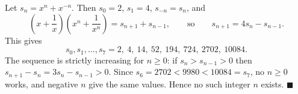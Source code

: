 Let $s_n=x^n+x^{-n}$. Then $s_0=2$, $s_1=4$, $s_{-n}=s_n$, and
\[\left(x+\dfrac1x\right)\left(x^n+\dfrac1{x^n}\right)=s_{n+1}+s_{n-1},\qquad\text{so}\qquad s_{n+1}=4s_n-s_{n-1}.\]
This gives
\[s_0,s_1,\dots,s_7=2,\ 4,\ 14,\ 52,\ 194,\ 724,\ 2702,\ 10084.\]
The sequence is strictly increasing for $n\ge0$: if $s_n>s_{n-1}>0$ then $s_{n+1}-s_n=3s_n-s_{n-1}>0$. Since $s_6=2702<9980<10084=s_7$, no $n\ge0$ works, and negative $n$ give the same values. Hence $\boxed{\text{no such integer }n}$ exists. $\blacksquare$
